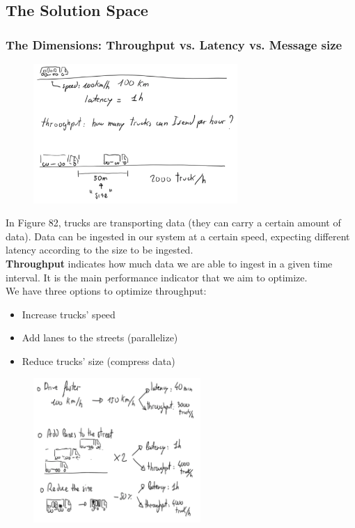 \documentclass[10pt,a4paper]{article}
\begin{document}
\subsection{The Solution Space}
\subsubsection{The Dimensions: Throughput vs. Latency vs. Message size}

\begin{figure}[ht!]
 \hfill \includegraphics[width=220pt]{images/the-dimensions.png}\hspace*{\fill}
\end{figure}  
In Figure 82, trucks are transporting data (they can carry a certain amount of data). Data can be ingested in our system at a certain speed, expecting different latency according to the size to be ingested.  \\
\textbf{Throughput} indicates how much data we are able to ingest in a given time interval. It is the main performance indicator that we aim to optimize. \\
We have three options to optimize throughput:
\begin{itemize}
	\item Increase trucks' speed
	\item Add lanes to the streets (parallelize)
	\item Reduce trucks' size (compress data)
\end{itemize}
\begin{figure}[ht!]
 \hfill \includegraphics[width=180pt]{images/increase-throughput.png}\hspace*{\fill}
\end{figure}  
\end{document}
